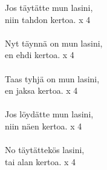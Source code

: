 
Jos täytätte mun lasini, \\ niin tahdon kertoa. x 4 \\ \hspace{10mm} \\ Nyt täynnä on mun lasini, \\ en ehdi kertoa. x 4 \\ \hspace{10mm} \\ Taas tyhjä on mun lasini, \\ en jaksa kertoa. x 4 \\ \hspace{10mm} \\ Jos löydätte mun lasini, \\ niin näen kertoa. x 4 \\ \hspace{10mm} \\ No täytättekös lasini, \\ tai alan kertoa. x 4